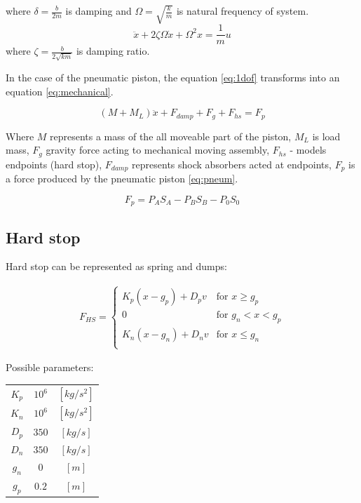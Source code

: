 \documentclass[class=article, crop=false]{standalone}
\begin{document}
where $\delta = \frac{b}{2m}$ is damping and $\Omega = \sqrt{\frac{k}{m}}$
is natural frequency of system.
\begin{equation*}
    \ddot{x} +2\zeta\Omega\dot{x} + \Omega^2x = \frac{1}{m}u
\end{equation*}
where $\zeta = \frac{b}{2\sqrt{km}}$ is damping ratio.

In the case of the pneumatic piston, the equation \ref{eq:1dof}
transforms into an equation \ref{eq:mechanical}.

\begin{equation}
    (M + M_L) \ddot{x} + F_{damp} + F_g + F_{hs}  = F_p
    \label{eq:mechanical}
\end{equation}

Where $M$ represents a mass of the all moveable part of the piston,
$M_L$ is load mass, $F_g$ gravity force acting to mechanical moving assembly,
$F_{hs}$ - models endpoints (hard stop),
$F_{damp}$ represents shock absorbers acted at endpoints,
$F_{p}$ is a force produced by the pneumatic piston \ref{eq:pneum}.

\begin{equation}
    F_p = P_A S_A - P_B S_B - P_0 S_0
    \label{eq:pneum}
\end{equation}



\subsection{Hard stop}
Hard stop can be represented as spring and dumps:

\begin{align}
    F_{HS} =
    \begin{cases}
        K_p(x-g_p) + D_pv & \text{for } x \ge g_p \\
        0 & \text{for } g_n < x < g_p \\
        K_n(x-g_n) + D_nv & \text{for } x \le g_n \\
    \end{cases}
\end{align}


Possible parameters: \\
\begin{tabular}{ |c|c|c| }
    \hline
    $K_p$ & $10^6$ & $[kg/s^2]$  \\
    $K_n$ & $10^6$ & $[kg/s^2]$  \\
    $D_p$ & $350$  & $[kg/s]$    \\
    $D_n$ & $350$  & $[kg/s]$    \\
    $g_n$ & $0  $  & $[m]$       \\
    $g_p$ & $0.2$  & $[m]$       \\
    \hline
\end{tabular}
\end{document}
